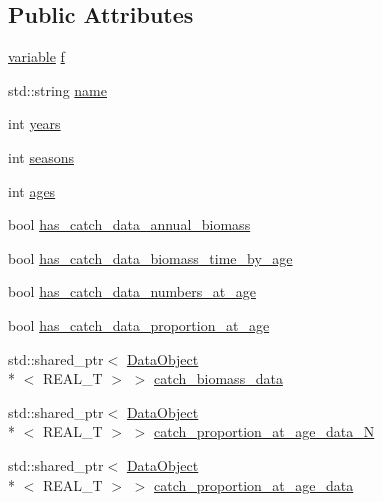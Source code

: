 \subsection*{Public Attributes}
\begin{DoxyCompactItemize}
\item 
\hyperlink{structmas_1_1_fleet_a1902d0842cb7ce9b9bdd4be013e709a9}{variable} \hyperlink{structmas_1_1_fleet_a940dd1929ae7d8efec755542a0462e45}{f}
\item 
std\-::string \hyperlink{structmas_1_1_fleet_a4c22a8ff3dfa7b1a7684afccfc461c54}{name}
\item 
int \hyperlink{structmas_1_1_fleet_a823238fd7eb794d49a64743395bf1ae5}{years}
\item 
int \hyperlink{structmas_1_1_fleet_a389f70f4bb3190303aba1ae9aca8c018}{seasons}
\item 
int \hyperlink{structmas_1_1_fleet_adc63e3bd51a0e1897fba4c726f7ca8f8}{ages}
\item 
bool \hyperlink{structmas_1_1_fleet_a983d40b11fbaef98245d435a6420f162}{has\-\_\-catch\-\_\-data\-\_\-annual\-\_\-biomass}
\item 
bool \hyperlink{structmas_1_1_fleet_aab0d326e2e7fb03bcd5a8073b526c255}{has\-\_\-catch\-\_\-data\-\_\-biomass\-\_\-time\-\_\-by\-\_\-age}
\item 
bool \hyperlink{structmas_1_1_fleet_ab292045bcb9dd21ab25a0b6f2404e351}{has\-\_\-catch\-\_\-data\-\_\-numbers\-\_\-at\-\_\-age}
\item 
bool \hyperlink{structmas_1_1_fleet_af74c0ec58026828cd286f6f4c317e517}{has\-\_\-catch\-\_\-data\-\_\-proportion\-\_\-at\-\_\-age}
\item 
std\-::shared\-\_\-ptr$<$ \hyperlink{structmas_1_1_data_object}{Data\-Object}\\*
$<$ R\-E\-A\-L\-\_\-\-T $>$ $>$ \hyperlink{structmas_1_1_fleet_a996dcf8ffd91799f62cf2421d81eaac0}{catch\-\_\-biomass\-\_\-data}
\item 
std\-::shared\-\_\-ptr$<$ \hyperlink{structmas_1_1_data_object}{Data\-Object}\\*
$<$ R\-E\-A\-L\-\_\-\-T $>$ $>$ \hyperlink{structmas_1_1_fleet_a39314db6371bbf66ec72d41e871e6eca}{catch\-\_\-proportion\-\_\-at\-\_\-age\-\_\-data\-\_\-\-N}
\item 
std\-::shared\-\_\-ptr$<$ \hyperlink{structmas_1_1_data_object}{Data\-Object}\\*
$<$ R\-E\-A\-L\-\_\-\-T $>$ $>$ \hyperlink{structmas_1_1_fleet_ae6c54a589f2e6cbdb413e3759bffca5d}{catch\-\_\-proportion\-\_\-at\-\_\-age\-\_\-data}
\item 

\end{DoxyCompactItemize}
